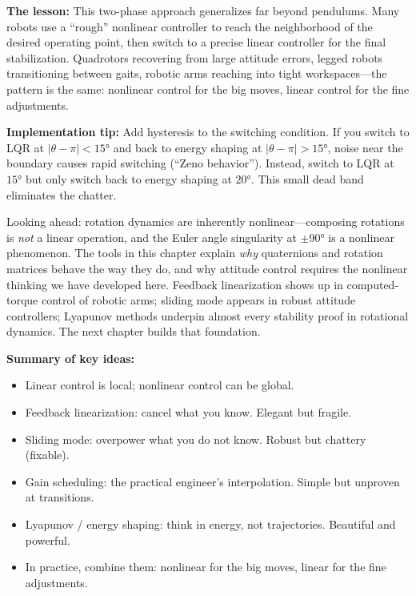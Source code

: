 \begin{mdframed}[linewidth=1pt, innertopmargin=10pt, innerbottommargin=10pt]
\textbf{The lesson:} This two-phase approach generalizes far beyond pendulums. Many robots use a ``rough'' nonlinear controller to reach the neighborhood of the desired operating point, then switch to a precise linear controller for the final stabilization. Quadrotors recovering from large attitude errors, legged robots transitioning between gaits, robotic arms reaching into tight workspaces---the pattern is the same: nonlinear control for the big moves, linear control for the fine adjustments.

\textbf{Implementation tip:} Add hysteresis to the switching condition. If you switch to LQR at $|\theta - \pi| < 15°$ and back to energy shaping at $|\theta - \pi| > 15°$, noise near the boundary causes rapid switching (``Zeno behavior''). Instead, switch to LQR at $15°$ but only switch back to energy shaping at $20°$. This small dead band eliminates the chatter.
\end{mdframed}

\vspace{1em}

Looking ahead: rotation dynamics are inherently nonlinear---composing rotations is \textit{not} a linear operation, and the Euler angle singularity at $\pm 90°$ is a nonlinear phenomenon. The tools in this chapter explain \textit{why} quaternions and rotation matrices behave the way they do, and why attitude control requires the nonlinear thinking we have developed here. Feedback linearization shows up in computed-torque control of robotic arms; sliding mode appears in robust attitude controllers; Lyapunov methods underpin almost every stability proof in rotational dynamics. The next chapter builds that foundation.

\textbf{Summary of key ideas:}
\begin{itemize}[nosep]
    \item Linear control is local; nonlinear control can be global.
    \item Feedback linearization: cancel what you know. Elegant but fragile.
    \item Sliding mode: overpower what you do not know. Robust but chattery (fixable).
    \item Gain scheduling: the practical engineer's interpolation. Simple but unproven at transitions.
    \item Lyapunov / energy shaping: think in energy, not trajectories. Beautiful and powerful.
    \item In practice, combine them: nonlinear for the big moves, linear for the fine adjustments.
\end{itemize}
